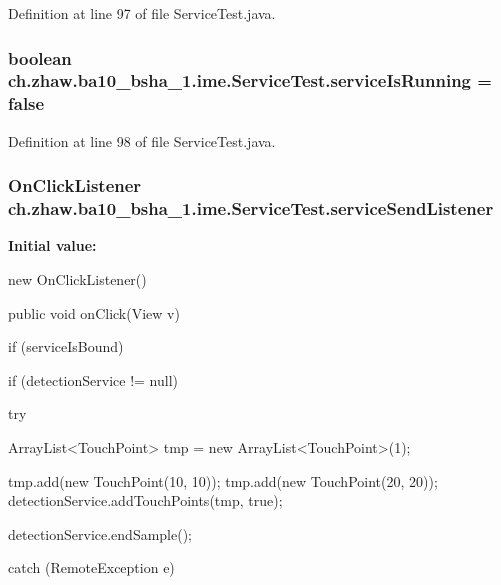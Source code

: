 Definition at line 97 of file ServiceTest.java.\hypertarget{classch_1_1zhaw_1_1ba10__bsha__1_1_1ime_1_1ServiceTest_a9e8f69bb91fbb935e81e07c927bc07ed}{
\subsubsection[{serviceIsRunning}]{\setlength{\rightskip}{0pt plus 5cm}boolean {\bf ch.zhaw.ba10\_\-bsha\_\-1.ime.ServiceTest.serviceIsRunning} = false}}
\label{classch_1_1zhaw_1_1ba10__bsha__1_1_1ime_1_1ServiceTest_a9e8f69bb91fbb935e81e07c927bc07ed}


Definition at line 98 of file ServiceTest.java.\hypertarget{classch_1_1zhaw_1_1ba10__bsha__1_1_1ime_1_1ServiceTest_af3586f921944718d5308e283836cd92f}{
\subsubsection[{serviceSendListener}]{\setlength{\rightskip}{0pt plus 5cm}OnClickListener {\bf ch.zhaw.ba10\_\-bsha\_\-1.ime.ServiceTest.serviceSendListener}}}
\label{classch_1_1zhaw_1_1ba10__bsha__1_1_1ime_1_1ServiceTest_af3586f921944718d5308e283836cd92f}
{\bfseries Initial value:}
\begin{DoxyCode}
 new OnClickListener() {
        public void onClick(View v) {
                if (serviceIsBound) {
                
                
                if (detectionService != null) {
                    try {
                        ArrayList<TouchPoint> tmp = new ArrayList<TouchPoint>(1);
      
                        tmp.add(new TouchPoint(10, 10));
                        tmp.add(new TouchPoint(20, 20));
                        detectionService.addTouchPoints(tmp, true);
                        
                        
                        
                        
                        detectionService.endSample();
                    } catch (RemoteException e) {
                        
                        
                    }
                }
            }
        }
    }
\end{DoxyCode}


